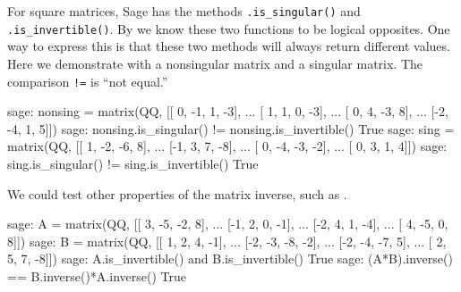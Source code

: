 For square matrices, Sage has the methods \verb?.is_singular()? and \verb?.is_invertible()?.  By  we know these two functions to be logical opposites.  One way to express this is that these two methods will always return different values.  Here we demonstrate with a nonsingular matrix and a singular matrix.  The comparison \verb?!=? is ``not equal.''
%
\begin{sageexample}
sage: nonsing = matrix(QQ, [[ 0, -1,  1, -3],
...                         [ 1,  1,  0, -3],
...                         [ 0,  4, -3,  8],
...                         [-2, -4,  1,  5]])
sage: nonsing.is_singular() != nonsing.is_invertible()
True
sage: sing = matrix(QQ, [[ 1, -2, -6,  8],
...                      [-1,  3,  7, -8],
...                      [ 0, -4, -3, -2],
...                      [ 0,  3,  1,  4]])
sage: sing.is_singular() != sing.is_invertible()
True
\end{sageexample}
%
We could test other properties of the matrix inverse, such as .
%
\begin{sageexample}
sage: A = matrix(QQ, [[ 3, -5, -2,  8],
...                   [-1,  2,  0, -1],
...                   [-2,  4,  1, -4],
...                   [ 4, -5,  0,  8]])
sage: B = matrix(QQ, [[ 1,  2,  4, -1],
...                   [-2, -3, -8, -2],
...                   [-2, -4, -7,  5],
...                   [ 2,  5,  7, -8]])
sage: A.is_invertible() and B.is_invertible()
True
sage: (A*B).inverse() == B.inverse()*A.inverse()
True
\end{sageexample}
%
\begin{sageverbatim}
\end{sageverbatim}
%
